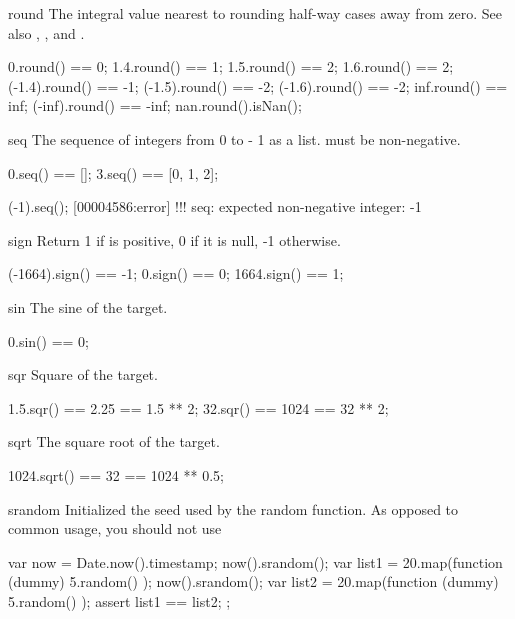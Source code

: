 \begin{urbiscriptapi}
\item[round] The integral value nearest to \this rounding half-way cases
  away from zero.  See also , , and
  .
\begin{urbiassert}
     0.round() ==  0;
   1.4.round() ==  1;     1.5.round() ==  2;    1.6.round() ==  2;
(-1.4).round() == -1;  (-1.5).round() == -2; (-1.6).round() == -2;
   inf.round() == inf; (-inf).round() == -inf;
   nan.round().isNan();
\end{urbiassert}


\item[seq]%
  The sequence of integers from 0 to \this - 1 as a list.  \this must be
  non-negative.
\begin{urbiassert}
0.seq() == [];  3.seq() == [0, 1, 2];

(-1).seq();
[00004586:error] !!! seq: expected non-negative integer: -1
\end{urbiassert}


\item[sign]
  Return 1 if \this is positive, 0 if it is null, -1
  otherwise.
\begin{urbiassert}
(-1664).sign() == -1;    0.sign() ==  0;   1664.sign() ==  1;
\end{urbiassert}


\item[sin]
  The sine of the target.
\begin{urbiassert}
0.sin() == 0;
\end{urbiassert}


\item[sqr]
  Square of the target.
\begin{urbiassert}
1.5.sqr() == 2.25 == 1.5 ** 2;
 32.sqr() == 1024 ==  32 ** 2;
\end{urbiassert}


\item[sqrt]
  The square root of the target.
\begin{urbiassert}
1024.sqrt() == 32 == 1024 ** 0.5;
\end{urbiassert}


\item[srandom]
  Initialized the seed used by the random function.  As opposed to common
  usage, you should not use
\begin{urbiunchecked}
{
  var now = Date.now().timestamp;
  now().srandom();
  var list1 = 20.map(function (dummy) { 5.random() });
  now().srandom();
  var list2 = 20.map(function (dummy) { 5.random() });
  assert
  {
    list1 == list2;
  }
};
\end{urbiunchecked}



\end{urbiscriptapi}
